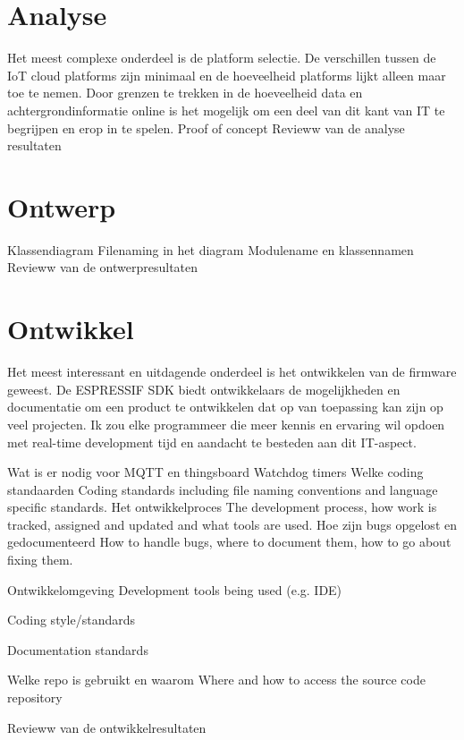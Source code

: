 		
		\section{Analyse}
		
		Het meest complexe onderdeel is de platform selectie. De verschillen tussen de IoT cloud platforms zijn minimaal en de hoeveelheid platforms lijkt alleen maar toe te nemen. Door grenzen te trekken in de hoeveelheid data en achtergrondinformatie online is het mogelijk om een deel van dit kant van IT te begrijpen en erop in te spelen.
		Proof of concept
		Revieww van de analyse resultaten
		
		
		\section{Ontwerp}
		
		Klassendiagram
		Filenaming in het diagram
		Modulename en klassennamen
		Revieww van de ontwerpresultaten
		
		
		\section{Ontwikkel}
		Het meest interessant en uitdagende onderdeel is het ontwikkelen van de firmware geweest. De ESPRESSIF SDK biedt ontwikkelaars de mogelijkheden en documentatie om een product te ontwikkelen dat op van toepassing kan zijn op veel projecten. Ik zou elke programmeer die meer kennis en ervaring wil opdoen met real-time development tijd en aandacht te besteden aan dit IT-aspect.
		
		Wat is er nodig voor MQTT en thingsboard
		Watchdog timers
		Welke coding standaarden
		Coding standards including file naming conventions and language specific standards.
		Het ontwikkelproces
		The development process, how work is tracked, assigned and updated and what tools are used.
		Hoe zijn bugs opgelost en gedocumenteerd
		How to handle bugs, where to document them, how to go about fixing them.
		
		Ontwikkelomgeving
		Development tools being used (e.g. IDE)
		
		Coding style/standards
		
		Documentation standards
		
		Welke repo is gebruikt en waarom
		Where and how to access the source code repository
		
		Revieww van de ontwikkelresultaten
		
		
		
		
		
